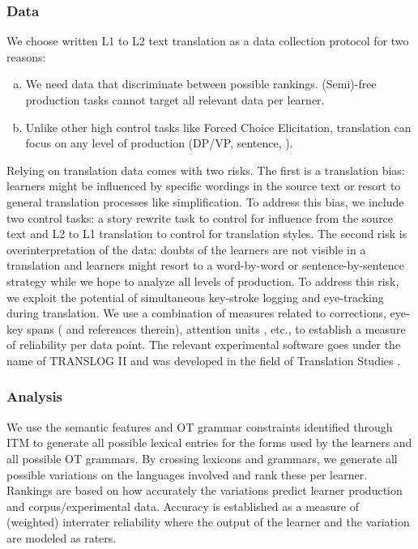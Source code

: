 \documentclass[output=paper,
modfonts
]{langscibook}
\begin{document}
\subsubsection{Data}

We choose written L1 to L2 text translation as a data collection protocol for two reasons:

\begin{enumerate}[(a)]
\item We need data that discriminate between possible rankings. (Semi)-free production tasks cannot target all relevant data per learner.
\item Unlike other high control tasks like Forced Choice Elicitation, translation can focus on any level of production (DP/VP, sentence, ).
\end{enumerate}


Relying on translation data comes with two risks. The first is a translation bias: learners might be influenced by specific wordings in the source text or resort to general translation processes like simplification. To address this bias, we include two control tasks: a story rewrite task to control for influence from the source text and L2 to L1 translation to control for translation styles. The second risk is overinterpretation of the data: doubts of the learners are not visible in a translation and learners might resort to a word-by-word or sentence-by-sentence strategy while we hope to analyze all levels of production. To address this risk, we exploit the potential of simultaneous key-stroke logging and eye-tracking during translation. We use a combination of measures related to corrections, eye-key spans (\citealt{Timarovaetal2011} and references therein), attention units \citep[e.g.][]{Hvelplund2016}, etc., to establish a measure of reliability per data point. The relevant experimental software goes under the name of TRANSLOG II and was developed in the field of Translation Studies \citep{SchwieterFerreira2017}.

\subsubsection{Analysis}

We use the semantic features and OT grammar constraints identified through ITM to generate all possible lexical entries for the forms used by the learners and all possible OT grammars. By crossing lexicons and grammars, we generate all possible variations on the languages involved and rank these per learner. Rankings are based on how accurately the variations predict learner production and corpus/experimental data. Accuracy is established as a measure of (weighted) interrater reliability where the output of the learner and the variation are modeled as raters.
\end{document}
